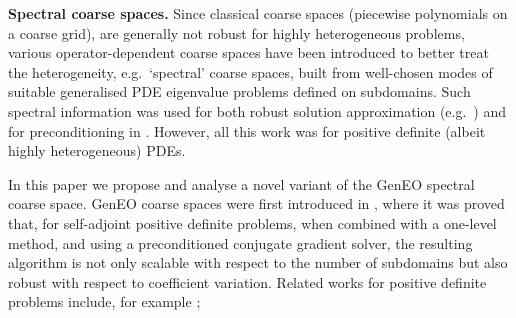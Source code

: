 \documentclass[numbers,webpdf,imaiai]{ima-authoring-template}%
\theoremstyle{thmstyletwo}%
\numberwithin{equation}{section}
\numberwithin{equation}{section}
\begin{document}
\smallskip
\noindent
\textbf{Spectral coarse spaces.}
Since classical coarse spaces (piecewise polynomials on a coarse grid), are generally not robust for highly heterogeneous problems, various  
operator-dependent coarse spaces have been  introduced to better treat the heterogeneity,  
e.g.\ `spectral' coarse spaces, built from well-chosen modes of suitable generalised PDE eigenvalue problems
defined on subdomains.  Such spectral information was used  for both robust solution approximation  (e.g.\    
\cite{Babuska:2011:OMSGFEM,Efendiev:2013:GMF}) and for  preconditioning in \cite{Galvisa:2010:DDP,Galvisb:2010:DDP}. 
However, all this work was for positive definite (albeit highly heterogeneous) PDEs.

In this paper we propose and analyse a novel variant of the GenEO spectral coarse space.
GenEO coarse spaces were first introduced in \cite{Spillane:2014:ARC}, where it was proved that, 
for self-adjoint positive definite problems, when combined with a one-level method, and using a preconditioned conjugate gradient solver,  
the resulting algorithm is not only scalable with respect to the number of subdomains but also robust with respect to coefficient variation.   
Related works for positive definite problems include, 
for example \cite{Agullo:2019:RPG, Heinlein:2019:AGC,Bastian:2021:MSD,Spillane:2021:TFA}; 
\end{document}
